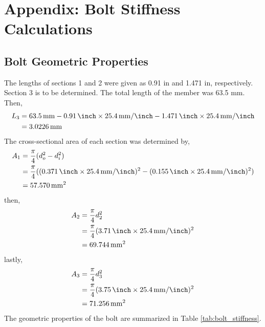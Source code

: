 \section{Appendix: Bolt Stiffness Calculations}
\label{app:bolt_stiffness}

\subsection{Bolt Geometric Properties}
The lengths of sections 1 and 2 were given as 0.91 in and 1.471 in, respectively. Section 3 is to be determined. The total length of the member was 63.5 mm. Then,
\begin{align*}
    L_3 &= \qty{63.5}{\milli\meter} - \qty{0.91}{\inch}\times \qty{25.4}{\milli\meter\per\inch} - \qty{1.471}{\inch}\times \qty{25.4}{\milli\meter\per\inch} \\
    &= \qty{3.0226}{\milli\meter}
\end{align*}
The cross-sectional area of each section was determined by,
\begin{align*}
    A_1 &= \frac{\pi}{4} (d_o^2 - d_i^2) \\
    &= \frac{\pi}{4} ((\qty{0.371}{\inch}\times \qty{25.4}{\milli\meter\per\inch})^2 - (\qty{0.155}{\inch}\times \qty{25.4}{\milli\meter\per\inch})^2) \\
    &= \qty{57.570}{\milli\meter\squared}
\end{align*}
then,
\begin{align*}
    A_2 &= \frac{\pi}{4} d_2^2 \\
    &= \frac{\pi}{4} (\qty{3.71}{\inch}\times \qty{25.4}{\milli\meter\per\inch})^2 \\
    &= \qty{69.744}{\milli\meter\squared}
\end{align*}
lastly,
\begin{align*}
    A_3 &= \frac{\pi}{4} d_3^2 \\
    &= \frac{\pi}{4} (\qty{3.75}{\inch}\times \qty{25.4}{\milli\meter\per\inch})^2 \\
    &= \qty{71.256}{\milli\meter\squared}
\end{align*}
The geometric properties of the bolt are summarized in Table \ref{tab:bolt_stiffness}.

